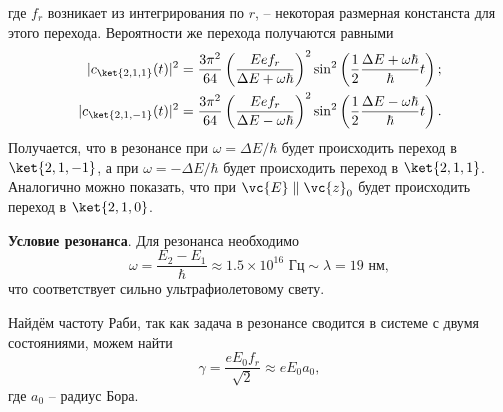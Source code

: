 где $f_r$ возникает из интегрирования по $r$, -- некоторая размерная констанста для этого перехода.
Вероятности же перехода получаются равными
\begin{align*}
    |c_{\ket{2,1,1}} (t)|^2 &= 
        \frac{3\pi^2}{64} \left(\frac{E e f_r}{\Delta E + \omega \hbar}\right)^2  \sin^2\left(
            \frac{1}{2} \frac{\Delta E + \omega \hbar}{ \hbar} t
        \right);
    \\
    |c_{\ket{2,1,-1}} (t)|^2 &=  
        \frac{3\pi^2}{64} \left(\frac{E e f_r}{\Delta E - \omega \hbar}\right)^2  \sin^2\left(
            \frac{1}{2} \frac{\Delta E - \omega \hbar}{ \hbar} t
        \right).
    \\
\end{align*}
Получается, что в резонансе при $\omega = \Delta E / \hbar$ будет происходить переход в $\ket{2,1,-1}$, а при $\omega = -\Delta E / \hbar$ будет происходить переход в $\ket{2,1,1}$.
Аналогично можно показать, что при $\vc{E} \parallel \vc{z}_0$ будет происходить переход в $\ket{2,1,0}$.


\textbf{Условие резонанса}. Для резонанса необходимо
\begin{equation*}
    \omega = \frac{E_2 - E_1}{\hbar} \approx 1.5 \times 10^{16} \text{ Гц} \sim \lambda = 19 \text{ нм},
\end{equation*}
что соответствует сильно ультрафиолетовому свету. 

Найдём частоту Раби, так как задача в резонансе сводится в системе с двумя состояниями, можем найти
\begin{equation*}
    \gamma = \frac{e E_0 f_r}{\sqrt{2}} \approx e E_0 a_0,
\end{equation*}
где $a_0$ -- радиус Бора. 
